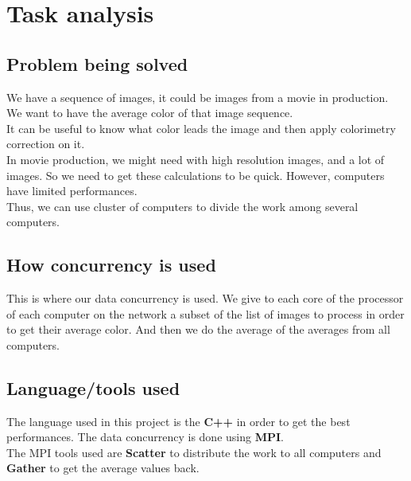 \section{Task analysis}

\subsection{Problem being solved}
We have a sequence of images, it could be images from a movie in production. We want to have the average color of that image sequence.\\
It can be useful to know what color leads the image and then apply colorimetry correction on it.\\
In movie production, we might need with high resolution images, and a lot of images. So we need to get these calculations to be quick. However, computers have limited performances.\\
Thus, we can use cluster of computers to divide the work among several computers.\\
\subsection{How concurrency is used}
This is where our data concurrency is used. We give to each core of the processor of each computer on the network a subset of the list of images to process in order to get their average color. And then we do the average of the averages from all computers.\\
\subsection{Language/tools used}
The language used in this project is the \textbf{C++} in order to get the best performances. The data concurrency is done using \textbf{MPI}.\\
The MPI tools used are \textbf{Scatter} to distribute the work to all computers and \textbf{Gather} to get the average values back.